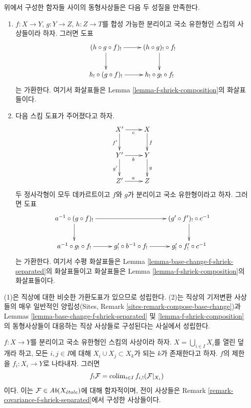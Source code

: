 \begin{remark}
\label{remark-f-shriek-base-change-composition}
위에서 구성한 함자들 사이의 동형사상들은 다음 두 성질을 만족한다.
\begin{enumerate}
\item $f : X \to Y$, $g : Y \to Z$, $h : Z \to T$를 합성 가능한
분리이고 국소 유한형인 스킴의 사상들이라 하자. 그러면 도표
$$
\xymatrix{
(h \circ g \circ f)_! \ar[r] \ar[d] &
(h \circ g)_! \circ f_! \ar[d] \\
h_! \circ (g \circ f)_! \ar[r] &
h_! \circ g_! \circ f_!
}
$$
는 가환한다. 여기서 화살표들은 Lemma
\ref{lemma-f-shriek-composition}의 화살표들이다.
\item 다음 스킴 도표가 주어졌다고 하자.
$$
\xymatrix{
X' \ar[d]_{f'} \ar[r]_c & X \ar[d]^f \\
Y' \ar[d]_{g'} \ar[r]_b & Y \ar[d]^g \\
Z' \ar[r]^a & Z
}
$$
두 정사각형이 모두 데카르트이고 $f$와 $g$가 분리이고 국소
유한형이라고 하자. 그러면 도표
$$
\xymatrix{
a^{-1} \circ (g \circ f)_! \ar[d] \ar[rr] & &
(g' \circ f')_! \circ c^{-1} \ar[d] \\
a^{-1} \circ g_! \circ f_! \ar[r] &
g'_! \circ b^{-1} \circ f_! \ar[r] &
g'_! \circ f'_! \circ c^{-1}
}
$$
는 가환한다. 여기서 수평 화살표들은 Lemma
\ref{lemma-base-change-f-shriek-separated}의 화살표들이고
화살표들은 Lemma \ref{lemma-f-shriek-composition}의 화살표들이다.
\end{enumerate}
(1)은 직상에 대한 비슷한 가환도표가 있으므로 성립한다. (2)는
직상의 기저변환 사상들의 매우 일반적인 양립성(Sites, Remark
\ref{sites-remark-compose-base-change})과 Lemmas
\ref{lemma-base-change-f-shriek-separated} 및
\ref{lemma-f-shriek-composition}의 동형사상들이 대응하는 직상
사상들로 구성된다는 사실에서 성립한다.
\end{remark}

\begin{lemma}
\label{lemma-colim-f-shriek-separated}
$f : X \to Y$를 분리이고 국소 유한형인 스킴의 사상이라 하자.
$X = \bigcup_{i \in I}X_i$를 열린 덮개라 하고, 모든 $i,j \in I$에
대해 $X_i \cup X_j \subset X_k$가 되는 $k$가 존재한다고 하자.
$f$의 제한을 $f_i : X_i \to Y$로 나타내자. 그러면
$$
f_!\mathcal{F} = \mathop{\mathrm{colim}}\nolimits_{i \in I} f_{i, !}(\mathcal{F}|_{X_i})
$$
이다. 이는 $\mathcal{F} \in \textit{Ab}(X_{\acute{e}tale})$에 대해 함자적이며,
전이 사상들은 Remark \ref{remark-covariance-f-shriek-separated}에서
구성한 사상들이다.
\end{lemma}

